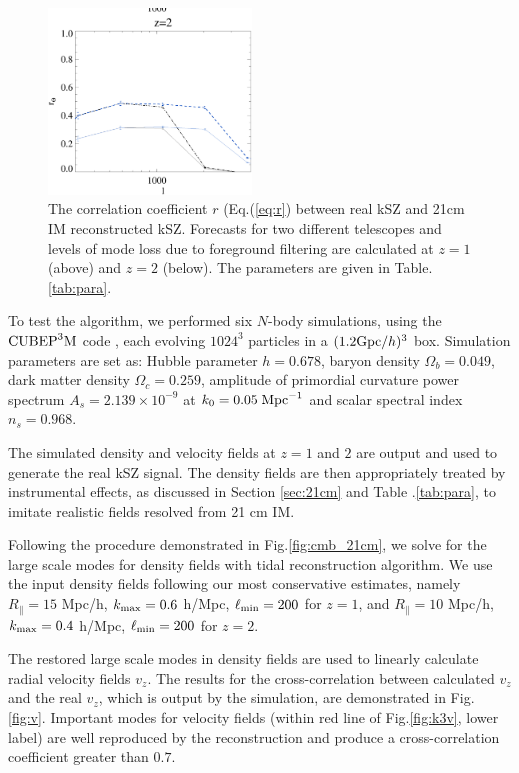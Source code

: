 \begin{figure}[tbp]
\begin{center}
\includegraphics[width=0.48\textwidth]{figure/cl_correlation_z1_z2.eps}
\end{center}
\vspace{-0.7cm}
\caption{The correlation coefficient $r$ (Eq.(\ref{eq:r}) between real kSZ  
and 21cm IM reconstructed kSZ. Forecasts for two different telescopes and levels of mode loss due to foreground filtering are calculated at $z=1$ (above) and $z=2$ (below). The parameters are given in Table.\ref{tab:para}. 
}
\label{fig:r}
\end{figure}
\label{ssec:tide}

To test the algorithm, we performed six $N$-body simulations, using the $\mathrm{CUBEP}^3\mathrm{M}$ code \cite{2013:code}, each evolving $1024^3$ particles in a $(1.2\mathrm{Gpc}/h)^3$ box. Simulation parameters are set as: Hubble parameter $h=0.678$, baryon density $\Omega_{b}=0.049$, dark matter density $\Omega_{c}=0.259$, amplitude of primordial curvature power spectrum $A_s=2.139\times10^{-9}$ at $k_0=0.05\;\mathrm{Mpc}^{-1}$ and scalar spectral index $n_s=0.968$.

The simulated density and velocity fields at $z=1$ and $2$ are output 
and used to generate the real kSZ signal. 
The density fields are then appropriately treated by instrumental effects, as discussed in Section \ref{sec:21cm} and Table .\ref{tab:para}, to imitate realistic fields resolved from 21 cm IM. 

Following the procedure demonstrated in Fig.\ref{fig:cmb_21cm}, 
we solve for the large scale modes for density fields with tidal reconstruction algorithm. 
We use the input density fields following our most conservative estimates, namely $R_\parallel=15$ Mpc/h, $k_\mathrm{max}=0.6$ h/Mpc, $\ell_\mathrm{min}=200$ for $z=1$, and $R_\parallel=10$ Mpc/h, $k_\mathrm{max}=0.4$ h/Mpc, $\ell_\mathrm{min}=200$ for $z=2$. 

The restored large scale modes in density fields are used to linearly calculate radial velocity fields $v_z$. 
The results for the cross-correlation between calculated $v_z$ and the real $v_z$, which is output by the simulation, are demonstrated in Fig.\ref{fig:v}. Important modes for velocity fields (within red line of Fig.\ref{fig:k3v}, lower label) are well reproduced by the reconstruction and produce a cross-correlation coefficient greater than $0.7$. 

